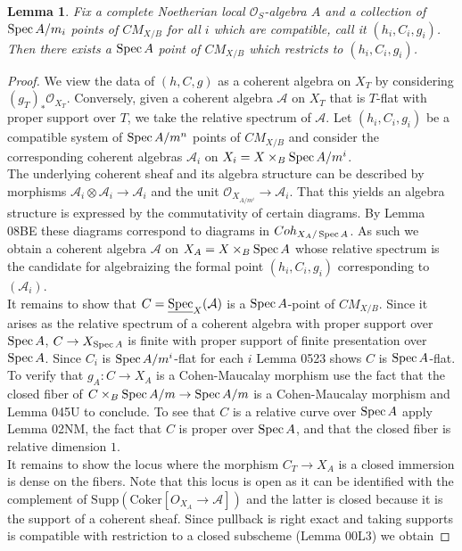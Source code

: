 \documentclass{stacks-project}
\theoremstyle{plain}
\newtheorem{lemma}[subsection]{Lemma}
\theoremstyle{definition}
\DeclareMathOperator{\Spec}{Spec}
\theoremstyle{remark}
\numberwithin{equation}{subsection}
\def\Spec{\mathop{\rm Spec}}
\begin{document}
\begin{lemma}
	\label{lemma-cm-existence}
	Fix a complete Noetherian local $\mathcal{O}_S$-algebra $A$ and a collection of $\Spec A/m_i$ points of $CM_{X/B}$ for all $i$ which are compatible, call it $(h_i,C_i,g_i)$. Then there exists a $\Spec A$ point of $CM_{X/B}$ which restricts to $(h_i,C_i,g_i)$. 
\end{lemma}

\begin{proof}

We view the data of $(h,C, g)$ as a coherent algebra on $X_T$ by considering $(g_T)_*\mathcal{O}_{X_T}$. Conversely, given a coherent algebra $\mathcal{A}$ on $X_T$ that is $T$-flat with proper support over $T$, we take the relative spectrum of $\mathcal{A}$. Let $(h_i,C_i,g_i)$ be a compatible system of $\Spec A/m^n$ points of $CM_{X/B}$ and consider the corresponding coherent algebras $\mathcal{A}_i$ on $X_i=X \times_B  \Spec A/m^i$. 
\\

The underlying coherent sheaf and its algebra structure can be described by morphisms $\mathcal{A}_i \otimes \mathcal{A}_i \to \mathcal{A}_i$ and the unit $\mathcal{O}_{X_{A/m^i}} \to \mathcal{A}_i$. That this yields an algebra structure is expressed by the commutativity of certain diagrams. By Lemma 08BE these diagrams correspond to diagrams in $Coh_{X_A/\Spec A}$. As such we obtain a coherent algebra $\mathcal{A}$ on $X_A=X \times_B \Spec A$ whose relative spectrum is the candidate for algebraizing the formal point $(h_i,C_i,g_i)$ corresponding to $(\mathcal{A}_i)$. 
\\

It remains to show that $C=\underline{\Spec}_X(\mathcal{A})$ is a $\Spec A$-point of $CM_{X/B}$. Since it arises as the relative spectrum of a coherent algebra with proper support over $\Spec A$, $C \to X_{\Spec A}$ is finite with proper support of finite presentation over $\Spec A$. Since $C_i$ is $\Spec A/m^i$-flat for each $i$ Lemma 0523 shows $C$ is $\Spec A$-flat. To verify that $g_A: C \to X_A$ is a Cohen-Maucalay morphism use the fact that the closed fiber of $C \times_B \Spec A/m \to \Spec A/m$ is a Cohen-Maucalay morphism and Lemma 045U to conclude. To see that $C$ is a relative curve over $\Spec A$ apply Lemma 02NM, the fact that $C$ is proper over $\Spec A$, and that the closed fiber is relative dimension $1$. 
\\

It remains to show the locus where the morphism $C_T \to X_A$ is a closed immersion is dense on the fibers. Note that this locus is open as it can be identified with the complement of $\text{Supp}(\text{Coker}[O_{X_A} \to \mathcal{A}])$ and the latter is closed because it is the support of a coherent sheaf. Since pullback is right exact and taking supports is compatible with restriction to a closed subscheme (Lemma 00L3) we obtain 


\end{proof}
\end{document}
